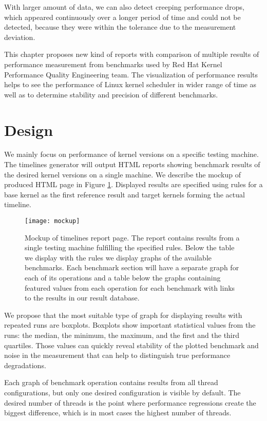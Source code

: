 With larger amount of data, we can also detect creeping performance drops, which
appeared continuously over a longer period of time and could not be detected,
because they were within the tolerance due to the measurement deviation.

This chapter proposes new kind of reports with comparison of multiple results of
performance measurement from benchmarks used by Red Hat Kernel Performance
Quality Engineering team. The visualization of performance results helps to see
the performance of Linux kernel scheduler in wider range of time as well as to
determine stability and precision of different benchmarks.

\section{Design}
We mainly focus on performance of kernel versions on a specific testing machine.
The timelines generator will output HTML reports showing benchmark results of
the desired kernel versions on a single machine. We describe the mockup of
produced HTML page in Figure \ref{fig:mockup}. Displayed results are specified
using rules for a base kernel as the first reference result and target kernels
forming the actual timeline.

\begin{figure}
  \centering
  \texttt{[image: mockup]}
  \caption{Mockup of timelines report page. The report contains results from a
    single testing machine fulfilling the specified rules. Below the table we
    display with the rules we display graphs of the available benchmarks. Each
    benchmark section will have a separate graph for each of its operations and
    a table below the graphs containing featured values from each operation for
    each benchmark with links to the results in our result database.}
  \label{fig:mockup}
\end{figure}

We propose that the most suitable type of graph for displaying results with
repeated runs are boxplots. Boxplots show important statistical values from the
runs: the median, the minimum, the maximum, and the first and the third
quartiles. Those values can quickly reveal stability of the plotted benchmark and
noise in the measurement that can help to distinguish true performance
degradations.

Each graph of benchmark operation contains results from all thread
configurations, but only one desired configuration is visible by default.
The desired number of threads is the point where performance regressions create
the biggest difference, which is in most cases the highest number of threads.


